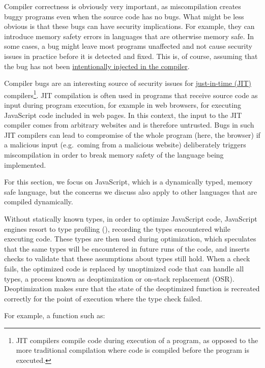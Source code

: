 \documentclass[
  a4paper,
]{report}
\begin{document}
Compiler correctness is obviously very important, as miscompilation
creates buggy programs even when the source code has no bugs. What might
be less obvious is that these bugs can have security implications. For
example, they can introduce memory safety errors in languages that are
otherwise memory safe. In some cases, a bug might leave most programs
unaffected and not cause security issues in practice before it is
detected and fixed. This is, of course, assuming that the bug has not
been \hyperref[supply-chain-attacks]{intentionally injected in the
compiler}.

Compiler bugs are an interesting source of security issues for
\href{https://en.wikipedia.org/wiki/Just-in-time_compilation}{just-in-time
(JIT)} compilers\footnote{JIT compilers compile
  code during execution of a program, as opposed to the more traditional
  compilation where code is compiled before the program is executed.}.
JIT compilation is often used in programs that receive source code as
input during program execution, for example in web browsers, for
executing JavaScript code included in web pages. In this context, the
input to the JIT compiler comes from arbitrary websites and is therefore
untrusted. Bugs in such JIT compilers can lead to compromise of the
whole program (here, the browser) if a malicious input (e.g.~coming from
a malicious website) deliberately triggers miscompilation in order to
break memory safety of the language being implemented.

For this section, we focus on JavaScript, which is a dynamically typed,
memory safe language, but the concerns we discuss also apply to other
languages that are compiled dynamically.

Without statically known types, in order to optimize JavaScript code,
JavaScript engines resort to type profiling
(), recording the types encountered
while executing code. These types are then used during optimization,
which speculates that the same types will be encountered in future runs
of the code, and inserts checks to validate that these assumptions about
types still hold. When a check fails, the optimized code is replaced by
unoptimized code that can handle all types, a process known as
deoptimization or on-stack replacement
(OSR). Deoptimization makes sure that
the state of the deoptimized function is recreated correctly for the
point of execution where the type check failed.

For example, a function such as:
\end{document}
